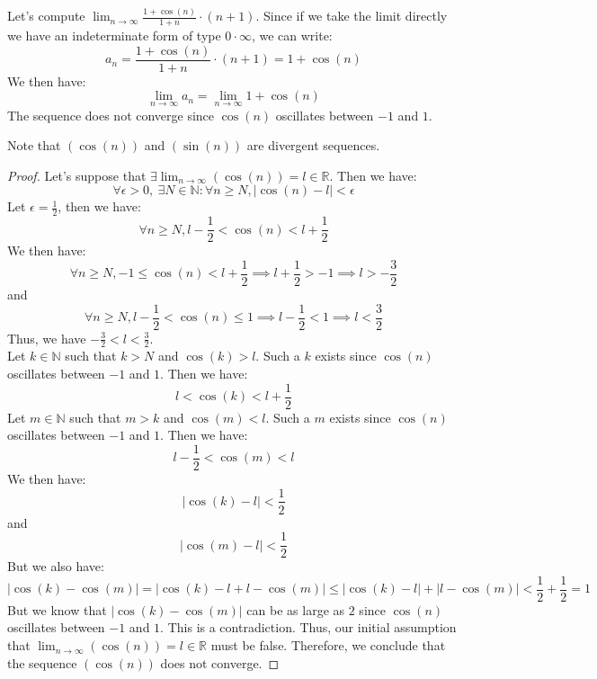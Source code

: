 \begin{eg}
    Let's compute $\lim_{n \to \infty} \frac{1 + \cos (n)}{1 + n} \cdot (n + 1)$. Since if we take the limit directly we have an indeterminate form of type $0 \cdot \infty$, we can write:
    \[ a_n = \frac{1 + \cos (n)}{1 + n} \cdot (n + 1) = 1 + \cos (n) \]
    We then have:
    \[ \lim_{n \to \infty} a_n = \lim_{n \to \infty} 1 + \cos (n) \]
    The sequence does not converge since $\cos(n)$ oscillates between $-1$ and $1$.
\end{eg}
Note that $(\cos (n))$ and $(\sin (n))$ are divergent sequences.
\begin{proof}
    Let's suppose that $\exists \lim_{n \to \infty} (\cos (n)) = l \in \mathbb{R}$. Then we have:
    \[ \forall \epsilon > 0, \ \exists N \in \mathbb{N} : \forall n \geq N, |\cos (n) - l| < \epsilon \]
    Let $\epsilon = \frac{1}{2}$, then we have:
    \[ \forall n \geq N, l - \frac{1}{2} < \cos (n) < l + \frac{1}{2} \]
    We then have:
    \[ \forall n \geq N, -1 \leq \cos (n) < l + \frac{1}{2} \implies l + \frac{1}{2} > -1 \implies l > -\frac{3}{2} \]
    and
    \[ \forall n \geq N, l - \frac{1}{2} < \cos (n) \leq 1 \implies l - \frac{1}{2} < 1 \implies l < \frac{3}{2} \]
    Thus, we have $-\frac{3}{2} < l < \frac{3}{2}$. \\
    Let $k \in \mathbb{N}$ such that $k > N$ and $\cos (k) > l$. Such a $k$ exists since $\cos (n)$ oscillates between $-1$ and $1$. Then we have:
    \[ l < \cos (k) < l + \frac{1}{2} \]
    Let $m \in \mathbb{N}$ such that $m > k$ and $\cos (m) < l$. Such a $m$ exists since $\cos (n)$ oscillates between $-1$ and $1$. Then we have:
    \[ l - \frac{1}{2} < \cos (m) < l \]
    We then have:
    \[ |\cos (k) - l| < \frac{1}{2} \]
    and
    \[ |\cos (m) - l| < \frac{1}{2} \]
    But we also have:
    \[ |\cos (k) - \cos (m)| = |\cos (k) - l + l - \cos (m)| \leq |\cos (k) - l| + |l - \cos (m)| < \frac{1}{2} + \frac{1}{2} = 1 \]
    But we know that $|\cos (k) - \cos (m)|$ can be as large as $2$ since $\cos (n)$ oscillates between $-1$ and $1$. This is a contradiction. Thus, our initial assumption that $\lim_{n \to \infty} (\cos (n)) = l \in \mathbb{R}$ must be false. Therefore, we conclude that the sequence \( (\cos(n)) \) does not converge.
\end{proof}


